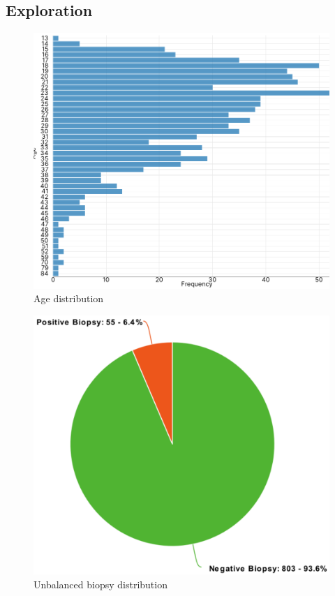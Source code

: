 \subsection{Exploration}
\begin{figure}
    \centerline{
        \includegraphics[width=0.4\paperwidth]{figures/age_dist.png}}
    \caption{Age distribution}
    \label{age_distribution}
\end{figure}

\begin{figure}
    \centerline{
        \includegraphics[width=0.3\paperwidth]{figures/class_unbalance.png}}
    \caption{Unbalanced biopsy distribution}
    \label{unbalanced_biopsy}
\end{figure}


